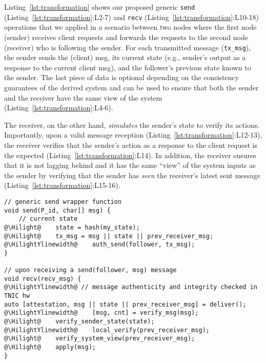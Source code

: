 Listing~\ref{lst:transformation} shows our proposed generic {\tt send} (Listing~\ref{lst:transformation}:L2-7) and {\tt recv} (Listing~\ref{lst:transformation}:L10-18) operations that we applied in a scenario between two nodes where the first node (sender) receives client requests and forwards the requests to the second node (receiver) who is following the sender. For each transmitted message ({\tt tx\_msg}), the sender sends the (client) msg, its current state (e.g., sender's output as a response to the current client msg), and the follower's previous state known to the sender. The last piece of data is optional depending on the consistency guarantees of the derived system and can be used to ensure that both the sender and the receiver have the same view of the system (Listing~\ref{lst:transformation}:L4-6). 

The receiver, on the other hand, {\em simulates} the sender's state to verify its actions. Importantly, upon a valid message reception (Listing~\ref{lst:transformation}:L12-13), the receiver verifies that the sender's action as a response to the client request is the expected (Listing~\ref{lst:transformation}:L14). In addition, the receiver ensures that it is not lagging behind and it has the same ``view'' of the system inputs as the sender by verifying that the sender has {\em seen} the receiver's latest sent message (Listing~\ref{lst:transformation}:L15-16).


{\small
\begin{lstlisting}[frame=h,style=customc,
                    label={lst:transformation},
                    caption= Generic application send and recv wrapper functions for transformation using \projecttitle{}: blue sections (native) and orange sections (\projecttitle additions).]
// generic send wrapper function
void send(P_id, char[] msg) {
    // current state
@\Hilight@    state = hash(my_state);
@\Hilight@    tx_msg = msg || state || prev_receiver_msg;
@\HilightYlinewidth@    auth_send(follower, tx_msg);
}

// upon receiving a send(follower, msg) message
void recv(recv_msg) {
@\HilightYlinewidth@ // message authenticity and integrity checked in TNIC hw
auto [attestation, msg || state || prev_receiver_msg] = deliver();
@\HilightYlinewidth@    [msg, cnt] = verify_msg(msg);
@\Hilight@    verify_sender_state(state);
@\HilightYlinewidth@    local_verify(prev_receiver_msg);
@\Hilight@    verify_system_view(prev_receiver_msg);
@\Hilight@    apply(msg);
}
\end{lstlisting}
}


